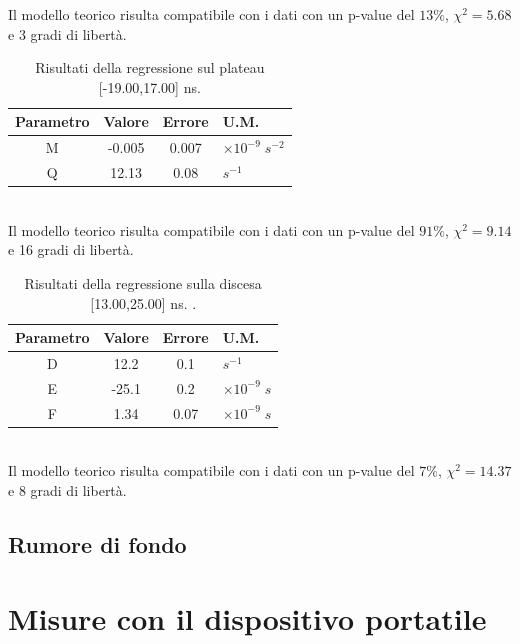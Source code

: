 \documentclass[11pt]{article} %
\begin{document}
Il modello teorico risulta compatibile con i dati con un p-value del $13\%$, $\chi ^2=5.68$ e 3 gradi di libertà.
\begin{table}[!h]
\begin{center}
\begin{tabular}{|c|c|c|l|}
\hline
\multicolumn{1}{|l|}{Parametro} & \multicolumn{1}{l|}{Valore} & \multicolumn{1}{l|}{Errore} & U.M. \\ \hline
M                               & -0.005                       & 0.007                 & $\times 10^{-9}\;s^{-2}$     \\ \hline
Q                               & 12.13                      & 0.08                           & $s^{-1}$    \\ \hline
\end{tabular}
\end{center}
\caption{Risultati della regressione sul plateau  [-19.00,17.00] ns.}
\end{table}
\\Il modello teorico risulta compatibile con i dati con un p-value del $91\%$, $\chi ^2=9.14$ e 16 gradi di libertà.
\begin{table}[!h]
\begin{center}
\begin{tabular}{|c|c|c|l|}
\hline
\multicolumn{1}{|l|}{Parametro} & \multicolumn{1}{l|}{Valore} & \multicolumn{1}{l|}{Errore} & U.M. \\ \hline
D                               & 12.2                       & 0.1                       &    $s^{-1}$  \\ \hline
E                               & -25.1                       & 0.2                           & $\times10^{-9}\;s$    \\ \hline
F                               & 1.34                          & 0.07                           & $\times10^{-9}\;s$    \\ \hline
\end{tabular}
\end{center}
\caption{Risultati della regressione sulla discesa [13.00,25.00] ns. .}
\end{table}
\\Il modello teorico risulta compatibile con i dati con un p-value del $7\%$, $\chi ^2=14.37$ e 8 gradi di libertà.
\subsection{Rumore di fondo}
\section{Misure con il dispositivo portatile}
\end{document}
